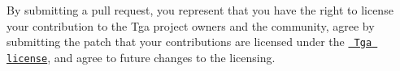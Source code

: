 By submitting a pull request, you represent that you have the right to license your contribution to the Tga project owners and the community, agree by submitting the patch that your contributions are licensed under the \href{https://raw.githubusercontent.com/aseprite/tga/main/LICENSE.txt}{\texttt{ Tga license}}, and agree to future changes to the licensing. 